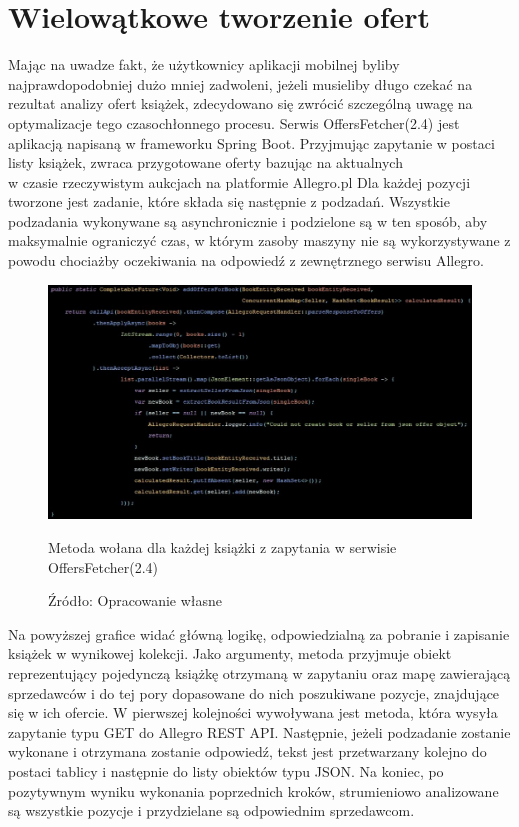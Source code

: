 \section{Wielowątkowe tworzenie ofert}
Mając na uwadze fakt, że użytkownicy aplikacji mobilnej byliby najprawdopodobniej dużo mniej zadwoleni, jeżeli musieliby długo czekać na rezultat analizy ofert książek, zdecydowano się zwrócić szczególną uwagę na optymalizacje tego czasochłonnego procesu.
Serwis OffersFetcher(2.4) jest aplikacją napisaną w frameworku Spring Boot. Przyjmując zapytanie w postaci listy książek, zwraca przygotowane oferty bazując na aktualnych\\w czasie rzeczywistym aukcjach na platformie Allegro.pl\newline
Dla każdej pozycji tworzone jest zadanie, które składa się następnie z podzadań. Wszystkie podzadania wykonywane są asynchronicznie i podzielone są w ten sposób, aby maksymalnie ograniczyć czas, w którym zasoby maszyny nie są wykorzystywane z powodu chociażby oczekiwania na odpowiedź z zewnętrznego serwisu Allegro.
\begin{figure}[H]
	\centering
	\includegraphics[width=\linewidth]{tasks.pdf}
	\caption{\centering Metoda wołana dla każdej książki z zapytania w serwisie OffersFetcher(2.4)}
	\caption*{\centering Źródło: {Opracowanie własne}}
\end{figure}
Na powyższej grafice widać główną logikę, odpowiedzialną za pobranie i zapisanie książek w wynikowej kolekcji. Jako argumenty, metoda przyjmuje obiekt reprezentujący pojedynczą książkę otrzymaną w zapytaniu oraz mapę zawierającą sprzedawców i do tej pory dopasowane do nich poszukiwane pozycje, znajdujące się w ich ofercie.
W pierwszej kolejności wywoływana jest metoda, która wysyła zapytanie typu GET do Allegro REST API. Następnie, jeżeli podzadanie zostanie wykonane i otrzymana zostanie odpowiedź, tekst jest przetwarzany kolejno do postaci tablicy i następnie do listy obiektów typu JSON.
Na koniec, po pozytywnym wyniku wykonania poprzednich kroków, strumieniowo analizowane są wszystkie pozycje i przydzielane są odpowiednim sprzedawcom.

